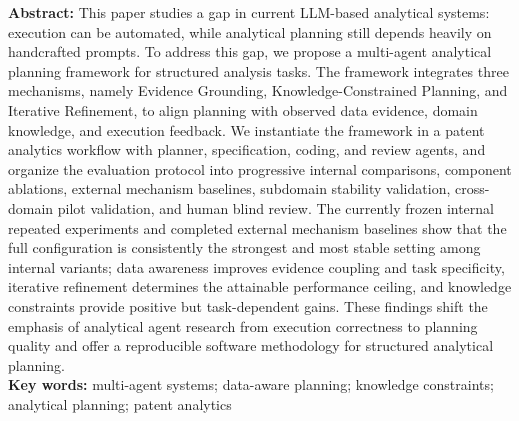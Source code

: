\documentclass{jos}
\begin{document}
\noindent\textbf{Abstract:} This paper studies a gap in current LLM-based analytical systems: execution can be automated, while analytical planning still depends heavily on handcrafted prompts. To address this gap, we propose a multi-agent analytical planning framework for structured analysis tasks. The framework integrates three mechanisms, namely Evidence Grounding, Knowledge-Constrained Planning, and Iterative Refinement, to align planning with observed data evidence, domain knowledge, and execution feedback. We instantiate the framework in a patent analytics workflow with planner, specification, coding, and review agents, and organize the evaluation protocol into progressive internal comparisons, component ablations, external mechanism baselines, subdomain stability validation, cross-domain pilot validation, and human blind review. The currently frozen internal repeated experiments and completed external mechanism baselines show that the full configuration is consistently the strongest and most stable setting among internal variants; data awareness improves evidence coupling and task specificity, iterative refinement determines the attainable performance ceiling, and knowledge constraints provide positive but task-dependent gains. These findings shift the emphasis of analytical agent research from execution correctness to planning quality and offer a reproducible software methodology for structured analytical planning.\\
\textbf{Key words:} multi-agent systems; data-aware planning; knowledge constraints; analytical planning; patent analytics













\end{document}
